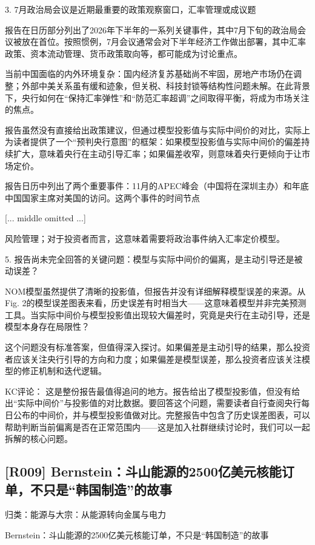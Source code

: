 \documentclass[11pt]{ctexart}
\begin{document}
3. 7月政治局会议是近期最重要的政策观察窗口，汇率管理或成议题

报告在日历部分列出了2026年下半年的一系列关键事件，其中7月下旬的政治局会议被放在首位。按照惯例，7月会议通常会对下半年经济工作做出部署，其中汇率政策、资本流动管理、货币政策取向等，都可能成为讨论重点。

当前中国面临的内外环境复杂：国内经济复苏基础尚不牢固，房地产市场仍在调整；外部中美关系虽有缓和迹象，但关税、科技封锁等结构性问题未解。在此背景下，央行如何在“保持汇率弹性”和“防范汇率超调”之间取得平衡，将成为市场关注的焦点。

报告虽然没有直接给出政策建议，但通过模型投影值与实际中间价的对比，实际上为读者提供了一个“预判央行意图”的框架：如果模型投影值与实际中间价的偏差持续扩大，意味着央行在主动引导汇率；如果偏差收窄，则意味着央行更倾向于让市场定价。

报告日历中列出了两个重要事件：11月的APEC峰会（中国将在深圳主办）和年底中国国家主席对美国的访问。这两个事件的时间节点

[... middle omitted ...]

风险管理；对于投资者而言，这意味着需要将政治事件纳入汇率定价模型。

5. 报告尚未完全回答的关键问题：模型与实际中间价的偏离，是主动引导还是被动误差？

NOM模型虽然提供了清晰的投影值，但报告并没有详细解释模型误差的来源。从Fig. 2的模型误差图表来看，历史误差有时相当大——这意味着模型并非完美预测工具。当实际中间价与模型投影值出现较大偏差时，究竟是央行在主动引导，还是模型本身存在局限性？

这个问题没有标准答案，但值得深入探讨。如果偏差是主动引导的结果，那么投资者应该关注央行引导的方向和力度；如果偏差是模型误差，那么投资者应该关注模型的修正机制和迭代逻辑。

KC评论： 这是整份报告最值得追问的地方。报告给出了模型投影值，但没有给出“实际中间价”与投影值的对比数据。要回答这个问题，需要读者自行查阅央行每日公布的中间价，并与模型投影值做对比。完整报告中包含了历史误差图表，可以帮助判断当前偏离是否在正常范围内——这是加入社群继续讨论时，我们可以一起拆解的核心问题。

\subsection{[R009] Bernstein：斗山能源的2500亿美元核能订单，不只是“韩国制造”的故事}
{\small\color{refgray}归类：能源与大宗：从能源转向金属与电力}

Bernstein：斗山能源的2500亿美元核能订单，不只是“韩国制造”的故事
\end{document}
